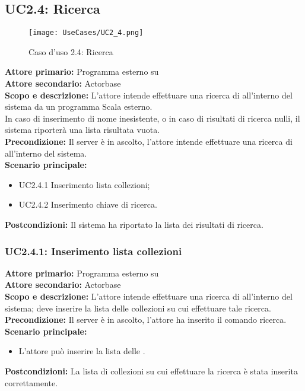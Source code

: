 \documentclass{scalatekids-article}
\begin{document}
\subsection{UC2.4: Ricerca}

\begin{figure}[H]
  \begin{center}
    \texttt{[image: UseCases/UC2\_4.png]}
    \caption*{Caso d'uso 2.4: Ricerca }
  \end{center}
\end{figure}
\textbf{Attore primario:} Programma esterno su \\
\textbf{Attore secondario:} Actorbase\\
\textbf{Scopo e descrizione:} L'attore intende effettuare una ricerca di  all'interno del sistema da un programma Scala esterno.\\
In caso di inserimento di nome  inesistente, o in caso di risultati di ricerca nulli, il sistema riporterà una lista risultata vuota.\\ %
\textbf{Precondizione:} Il server è in ascolto, l'attore intende effettuare una ricerca di  all'interno del sistema.\\
\textbf{Scenario principale:}
\begin{itemize}
\item UC2.4.1 Inserimento lista collezioni;
\item UC2.4.2 Inserimento chiave di ricerca.
\end{itemize}
\textbf{Postcondizioni:} Il sistema ha riportato la lista dei risultati di ricerca.

\subsubsection{UC2.4.1: Inserimento lista collezioni}

\textbf{Attore primario:} Programma esterno su \\
\textbf{Attore secondario:} Actorbase\\
\textbf{Scopo e descrizione:} L'attore intende effettuare una ricerca di  all'interno del sistema; deve inserire la lista delle collezioni su cui effettuare tale ricerca.\\
\textbf{Precondizione:} Il server è in ascolto, l'attore ha inserito il comando ricerca.\\
\textbf{Scenario principale:}
\begin{itemize}
\item L'attore può inserire la lista delle .
\end{itemize}
\textbf{Postcondizioni:} La lista di collezioni su cui effettuare la ricerca è stata inserita correttamente.
\end{document}
